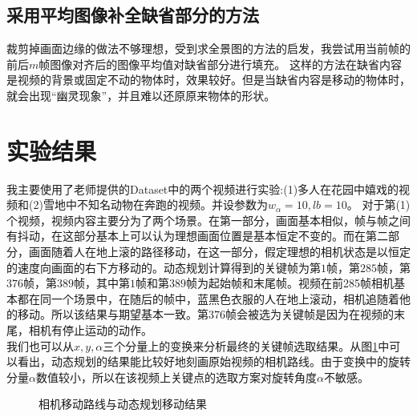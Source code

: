 \documentclass[journal, a4paper]{IEEEtran}
\begin{document}
\subsection{采用平均图像补全缺省部分的方法}
    裁剪掉画面边缘的做法不够理想，受到求全景图的方法的启发，我尝试用当前帧的前后$m$帧图像对齐后的图像平均值对缺省部分进行填充。
    这样的方法在缺省内容是视频的背景或固定不动的物体时，效果较好。但是当缺省内容是移动的物体时，就会出现“幽灵现象”，并且难以还原原来物体的形状。
    
\section{实验结果}
    我主要使用了老师提供的Dataset中的两个视频进行实验:(1)多人在花园中嬉戏的视频和(2)雪地中不知名动物在奔跑的视频。并设参数为$w_\alpha =10,lb=10$。
    对于第(1)个视频，视频内容主要分为了两个场景。在第一部分，画面基本相似，帧与帧之间有抖动，在这部分基本上可以认为理想画面位置是基本恒定不变的。而在第二部分，画面随着人在地上滚的路径移动，在这一部分，假定理想的相机状态是以恒定的速度向画面的右下方移动的。动态规划计算得到的关键帧为第$1$帧，第$285$帧，第$376$帧，第$389$帧，其中第$1$帧和第$389$帧为起始帧和末尾帧。视频在前285帧相机基本都在同一个场景中，在随后的帧中，蓝黑色衣服的人在地上滚动，相机追随着他的移动。所以该结果与期望基本一致。第$376$帧会被选为关键帧是因为在视频的末尾，相机有停止运动的动作。\\
    
    我们也可以从$x,y,\alpha$三个分量上的变换来分析最终的关键帧选取结果。从图\ref{fig:DP_motion_c}中可以看出，动态规划的结果能比较好地刻画原始视频的相机路线。由于变换中的旋转分量$\alpha$数值较小，所以在该视频上关键点的选取方案对旋转角度$\alpha$不敏感。 \\
    \begin{figure}[!hbt]
      \begin{center}
          \caption{相机移动路线与动态规划移动结果}
          \label{fig:DP_motion_c}
      \end{center}
    \end{figure}
    
\end{document}
